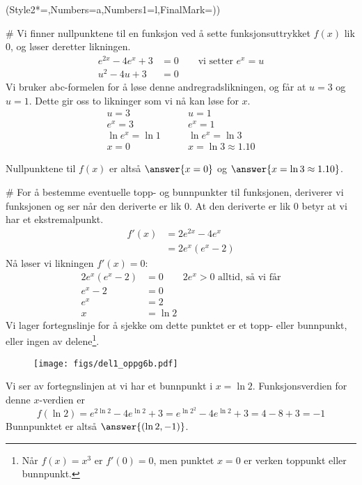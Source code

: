 \begin{easylist}[enumerate]
	\ListProperties(Style2*=,Numbers=a,Numbers1=l,FinalMark={)})
	
	# Vi finner nullpunktene til en funksjon ved å sette funksjonsuttrykket $f(x)$ lik $0$, og løser deretter likningen.
	\begin{align*}
		e^{2x} - 4e^{x} + 3 &= 0 \qquad \text{vi setter $e^x = u$}\\ 
		u^2 - 4u + 3 &= 0
	\end{align*}
	Vi bruker abc-formelen for å løse denne andregradslikningen, og får at $u = 3$ og $u = 1$. Dette gir oss to likninger som vi nå kan løse for $x$.
	\begin{align*}
		u = 3 & \qquad u = 1 \\
		e^x = 3 & \qquad e^x = 1 \\
		\ln e^x = \ln 1 & \qquad \ln e^x = \ln 3\\
		x = 0 & \qquad x = \ln 3 \approx 1.10
	\end{align*}
	
	Nullpunktene til $f(x)$ er altså $	\answer{x = 0}$ og $\answer{x = \ln 3 \approx 1.10}$.
	
	# For å bestemme eventuelle topp- og bunnpunkter til funksjonen, deriverer vi funksjonen og ser når den deriverte er lik $0$. 
	At den deriverte er lik $0$ betyr at vi har et ekstremalpunkt.
	\begin{align*}
		f'(x) &= 2e^{2x} - 4e^x \\
		& = 2e^x(e^x - 2)
	\end{align*}
	Nå løser vi likningen $f'(x) = 0$:
	\begin{align*}
		2e^x(e^x - 2) & = 0 \qquad \text{$2e^x > 0$ alltid, så vi får}\\
		e^x - 2 & = 0 \\
		e^x & = 2 \\
		x & = \ln 2
	\end{align*}
	Vi lager fortegnslinje for å sjekke om dette punktet er et topp- eller bunnpunkt, eller ingen av delene\footnote{Når $f(x) = x^3$ er $f'(0) = 0$, men punktet $x=0$ er verken toppunkt eller bunnpunkt.}.
	\begin{figure}[ht!]
		\centering
		\texttt{[image: figs/del1\_oppg6b.pdf]}
		\label{fig:del1_oppg6b}
	\end{figure}
	Vi ser av fortegnslinjen at vi har et bunnpunkt i $x = \ln 2$. Funksjonsverdien for denne $x$-verdien er
	\begin{equation*}
		f(\ln 2)  = e^{2\ln2} - 4e^{\ln 2} + 3 
		= e^{\ln 2^2} - 4e^{\ln 2} + 3  
		= 4 - 8 + 3 = -1
	\end{equation*}
	Bunnpunktet er altså $\answer{(\ln 2, -1)}$.
	

\end{easylist}
